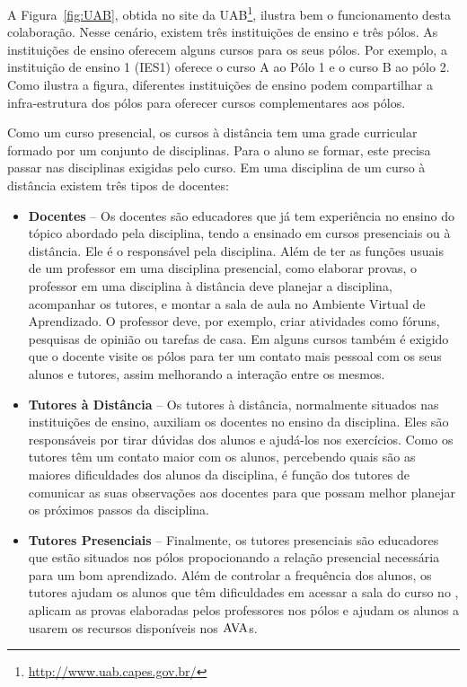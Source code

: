 A Figura~\ref{fig:UAB}, obtida no site da UAB\footnote{\url{http://www.uab.capes.gov.br/}}, 
ilustra bem o funcionamento desta colabora{\c c}{\~ a}o. Nesse cen{\' a}rio, existem tr{\^ e}s institui{\c c}{\~ o}es
de ensino e tr{\^ e}s p{\' o}los. As institui{\c c}{\~ o}es de ensino oferecem alguns cursos para os seus 
p{\' o}los. Por exemplo, a institui{\c c}{\~ a}o de ensino 1 (IES1) oferece o curso A ao P{\' o}lo 1 e 
o curso B ao p{\' o}lo 2. Como ilustra a figura, diferentes institui{\c c}{\~ o}es de ensino podem
compartilhar a infra-estrutura dos p{\' o}los para oferecer cursos complementares aos p{\' o}los.

Como um curso presencial, os cursos {\` a} dist{\^ a}ncia tem uma grade curricular formado 
por um conjunto de disciplinas. Para o aluno se formar, este precisa passar nas disciplinas
exigidas pelo curso. Em uma disciplina de um curso {\` a} dist{\^ a}ncia existem tr{\^ e}s tipos de docentes:
\begin{itemize}
 \item \textbf{Docentes} -- Os docentes s{\~ a}o educadores que j{\' a} tem experi{\^ e}ncia no ensino do t{\' o}pico 
 abordado pela disciplina, tendo a ensinado em cursos presenciais ou {\` a} dist{\^ a}ncia. Ele {\' e} o respons{\' a}vel 
 pela disciplina. Al{\' e}m de ter as fun{\c c}{\~ o}es usuais de um professor em uma disciplina presencial, como 
 elaborar provas, 
 o professor em uma disciplina {\` a} dist{\^ a}ncia deve planejar a disciplina, acompanhar os tutores, e montar a sala de aula 
 no Ambiente Virtual de Aprendizado. O professor deve, por exemplo, criar
atividades como f{\' o}runs, pesquisas de opini{\~ a}o ou tarefas de casa.
 Em alguns cursos tamb{\' e}m {\' e} exigido que o docente visite os p{\' o}los para ter um contato mais pessoal 
 com os seus alunos e tutores, assim melhorando a intera{\c c}{\~ a}o entre os mesmos.
 
 \item \textbf{Tutores {\` a} Dist{\^ a}ncia} -- Os tutores {\` a} dist{\^ a}ncia, normalmente situados nas institui{\c c}{\~ o}es de ensino, 
 auxiliam os docentes no ensino da disciplina. Eles s{\~ a}o respons{\' a}veis por tirar d{\' u}vidas dos alunos e ajud{\' a}-los 
 nos exerc{\' i}cios. Como os tutores t{\^ e}m um contato maior com os alunos, percebendo quais s{\~ a}o as maiores 
 dificuldades dos alunos da disciplina, {\' e} fun{\c c}{\~ a}o dos tutores de comunicar as suas observa{\c c}{\~ o}es
 aos docentes para que possam melhor planejar os pr{\' o}ximos passos da disciplina. 
 
 
 \item \textbf{Tutores Presenciais} -- Finalmente, os tutores presenciais s{\~ a}o educadores que est{\~ a}o situados nos p{\' o}los
 propocionando a rela{\c c}{\~ a}o presencial necess{\' a}ria para um bom aprendizado. 
Al{\' e}m de controlar a frequ{\^ e}ncia dos alunos, os tutores ajudam os alunos que t{\^ e}m
dificuldades em acessar a sala do curso no 
 \ava, aplicam as provas elaboradas pelos professores nos p{\' o}los e 
 ajudam os alunos a usarem os recursos dispon{\' i}veis nos $\hbox{AVA}$s. 
\end{itemize}

